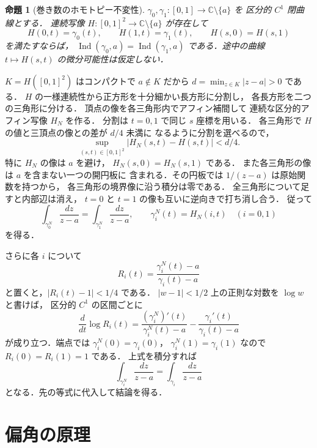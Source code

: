 \documentclass[a5paper,10pt,onecolumn]{jsarticle}
\makeatletter
\theoremstyle{mathnotetheorem}
\newtheorem{proposition}[theorem]{命題}
\renewcommand{\proofname}{証明}
\renewenvironment{proof}[1][\proofname]{%
  \par\pushQED{\qed}\normalfont\topsep4\p@\@plus2\p@\relax
  \trivlist\item[\hskip\labelsep\bfseries #1]\ignorespaces
}{\popQED\endtrivlist\@endpefalse}
\makeatother
\begin{document}
\begin{proposition}[巻き数のホモトピー不変性]\label{prop:index-homotopy}
$\gamma_0,\gamma_1:[0,1]\to\mathbb C\setminus\{a\}$ を
区分的 $C^1$ 閉曲線とする．
連続写像 $H:[0,1]^2\to\mathbb C\setminus\{a\}$ が存在して
\[
 H(0,t)=\gamma_0(t),\qquad
 H(1,t)=\gamma_1(t),\qquad
 H(s,0)=H(s,1)
\]
を満たすならば，
$\operatorname{Ind}(\gamma_0,a)=\operatorname{Ind}(\gamma_1,a)$
である．途中の曲線 $t\mapsto H(s,t)$ の微分可能性は仮定しない．
\end{proposition}
\begin{proof}
$K=H([0,1]^2)$ はコンパクトで $a\notin K$ だから
$d=\min_{z\in K}|z-a|>0$ である．
$H$ の一様連続性から正方形を十分細かい長方形に分割し，
各長方形を二つの三角形に分ける．
頂点の像を各三角形内でアフィン補間して
連続な区分的アフィン写像 $H_N$ を作る．
分割は $t=0,1$ で同じ $s$ 座標を用いる．
各三角形で $H$ の値と三頂点の像との差が $d/4$ 未満に
なるように分割を選べるので，
\[
 \sup_{(s,t)\in[0,1]^2}|H_N(s,t)-H(s,t)|<d/4.
\]
特に $H_N$ の像は $a$ を避け，
$H_N(s,0)=H_N(s,1)$ である．
また各三角形の像は $a$ を含まない一つの開円板に
含まれる．その円板では $1/(z-a)$ は原始関数を持つから，
各三角形の境界像に沿う積分は零である．
全三角形について足すと内部辺は消え，
$t=0$ と $t=1$ の像も互いに逆向きで打ち消し合う．
従って
\[
 \int_{\gamma_0^N}\frac{dz}{z-a}
 =\int_{\gamma_1^N}\frac{dz}{z-a},
 \qquad \gamma_i^N(t)=H_N(i,t)\quad(i=0,1)
\]
を得る．

さらに各 $i$ について
\[
 R_i(t)=\frac{\gamma_i^N(t)-a}{\gamma_i(t)-a}
\]
と置くと，$|R_i(t)-1|<1/4$ である．
$|w-1|<1/2$ 上の正則な対数を $\log w$ と書けば，
区分的 $C^1$ の区間ごとに
\[
 \frac{d}{dt}\log R_i(t)
 =\frac{(\gamma_i^N)'(t)}{\gamma_i^N(t)-a}
  -\frac{\gamma_i'(t)}{\gamma_i(t)-a}
\]
が成り立つ．端点では
$\gamma_i^N(0)=\gamma_i(0)$，
$\gamma_i^N(1)=\gamma_i(1)$ なので
$R_i(0)=R_i(1)=1$ である．
上式を積分すれば
\[
 \int_{\gamma_i^N}\frac{dz}{z-a}
 =\int_{\gamma_i}\frac{dz}{z-a}
\]
となる．先の等式に代入して結論を得る．
\end{proof}

\section{偏角の原理}
\end{document}
